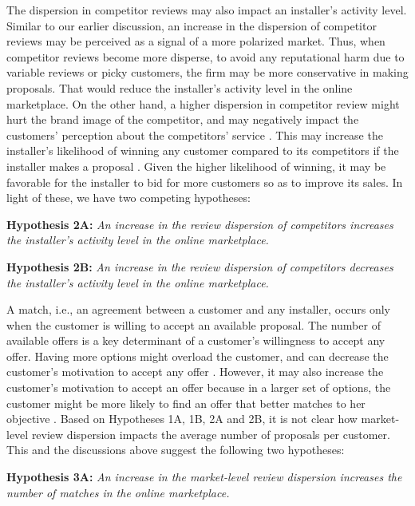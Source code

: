 \documentclass[msom,blindrev]{informs3}
\begin{document}
	The dispersion in competitor reviews may also impact an installer's activity level. Similar to our earlier discussion, an increase in the dispersion of competitor reviews may be perceived as a signal of a more polarized market. Thus, when competitor reviews become more disperse, to avoid any reputational harm due to variable reviews or picky customers, the firm may be more conservative in making proposals. That would reduce the installer's activity level in the online marketplace. On the other hand, a higher dispersion in competitor review might hurt the brand image of the competitor, and may negatively impact the customers' perception about the competitors' service \citep{chakraborty2018credibility,chakraborty2018effects,Zhu}. This may increase the installer's likelihood of winning any customer compared to its competitors if the installer makes a proposal \citep{demirag2011risks,moreno2014doing}. Given the higher likelihood of winning, it may be favorable for the installer to bid for more customers so as to improve its sales. In light of these, we have two competing hypotheses:
	
	
	\noindent\textbf{Hypothesis 2A:} \emph{An increase in the review dispersion of competitors increases the installer's activity level in the online marketplace.}
	
	\noindent\textbf{Hypothesis 2B:} \emph{An increase in the review dispersion of competitors decreases the installer's activity level in the online marketplace.}
	
	A match, i.e., an agreement between a customer and any installer, occurs only when the customer is willing to accept an available proposal. The number of available offers is a key determinant of a customer's willingness to accept any offer. Having more options might overload the customer, and can decrease the customer's motivation to accept any offer \citep{scheibehenne2010can,iyengar2000choice}. However, it may also increase the customer's motivation to accept an offer because in a larger set of options, the customer  might be more likely to find an offer that better matches to her objective \citep{scheibehenne2010can,baumol1956variety}. Based on Hypotheses 1A, 1B, 2A and 2B, it is not clear how market-level review dispersion impacts the average number of proposals per customer. This and the discussions above  suggest the following two hypotheses:
	
	
	\noindent\textbf{Hypothesis 3A:} \emph{An increase in the market-level review dispersion increases the number of matches in the online marketplace.}
	
\end{document}
